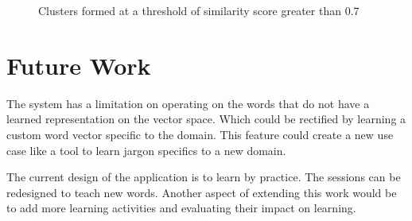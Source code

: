 \documentclass[11pt,a4paper]{article}
\begin{document}
\begin{figure}[p!]
{  }
  \hspace{0mm}
  \caption{Clusters formed at a threshold of similarity score greater than 0.7}
  \label{fig:clusters}
\end{figure}

\section{Future Work}
The system has a limitation on operating on the words that do not have a learned representation on the vector space. Which could be rectified by learning a custom word vector specific to the domain. This feature could create a new use case like a tool to learn jargon specifics to a new domain.

The current design of the application is to learn by practice. The sessions can be redesigned to teach new words. Another aspect of extending this work would be to add more learning activities and evaluating their impact on learning.
\end{document}
